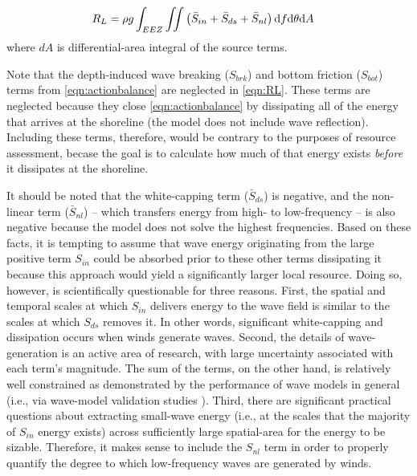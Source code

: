 \begin{align}
  R_L &= \rho g \int_{EEZ}\iint \left ( \bar{S}_{in} + \bar{S}_{ds} + \bar{S}_{nl} \right ) \mathrm{d} f \mathrm{d} \theta \mathrm{d} A
\label{eqn:RL}
\end{align}
where $dA$ is differential-area integral of the source terms.

Note that the depth-induced wave breaking ($S_{brk}$) and bottom friction ($S_{bot}$) terms from \eqref{eqn:actionbalance} are neglected in \eqref{eqn:RL}.
These terms are neglected because they close \eqref{eqn:actionbalance} by dissipating all of the energy that arrives at the shoreline (the model does not include wave reflection). Including these terms, therefore, would be contrary to the purposes of resource assessment, becase the goal is to calculate how much of that energy exists \textit{before} it dissipates at the shoreline.

It should be noted that the white-capping term ($\bar{S}_{ds}$) is negative, and the non-linear term ($\bar{S}_{nl}$) -- which transfers energy from high- to low-frequency -- is also negative because the model does not solve the highest frequencies.
Based on these facts, it is tempting to assume that wave energy originating from the large positive term $S_{in}$ could be absorbed prior to these other terms dissipating it because this approach would yield a significantly larger local resource. Doing so, however, is scientifically questionable for three reasons. First, the spatial and temporal scales at which $S_{in}$ delivers energy to the wave field is similar to the scales at which $S_{ds}$ removes it. In other words, significant white-capping and dissipation occurs when winds generate waves. Second, the details of wave-generation is an active area of research, with large uncertainty associated with each term's magnitude. The sum of the terms, on the other hand, is relatively well constrained as demonstrated by the performance of wave models in general (i.e., via wave-model validation studies \citep[e.g.][]{ardhuin_semiempirical_2010,van_vledder_source_2016}). Third, there are significant practical questions about extracting small-wave energy (i.e., at the scales that the majority of $S_{in}$ energy exists) across sufficiently large spatial-area for the energy to be sizable. Therefore, it makes sense to include the $S_{nl}$ term in order to properly quantify the degree to which low-frequency waves are generated by winds.


